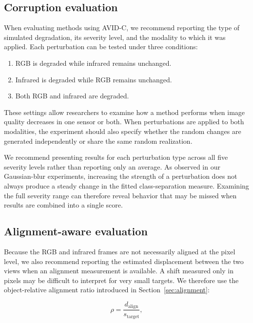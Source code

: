 \documentclass[10pt]{article}
\newcommand{\corrupt}{\textsc{AVID-C}}
\begin{document}
\subsection{Corruption evaluation}

When evaluating methods using \corrupt{}, we recommend reporting the type of simulated degradation, its severity level, and the modality to which it was applied. Each perturbation can be tested under three conditions:

\begin{enumerate}
    \item RGB is degraded while infrared remains unchanged.
    \item Infrared is degraded while RGB remains unchanged.
    \item Both RGB and infrared are degraded.
\end{enumerate}

These settings allow researchers to examine how a method performs when image quality decreases in one sensor or both. When perturbations are applied to both modalities, the experiment should also specify whether the random changes are generated independently or share the same random realization.

We recommend presenting results for each perturbation type across all five severity levels rather than reporting only an average. As observed in our Gaussian-blur experiments, increasing the strength of a perturbation does not always produce a steady change in the fitted class-separation measure. Examining the full severity range can therefore reveal behavior that may be missed when results are combined into a single score.

\subsection{Alignment-aware evaluation}

Because the RGB and infrared frames are not necessarily aligned at the pixel level, we also recommend reporting the estimated displacement between the two views when an alignment measurement is available. A shift measured only in pixels may be difficult to interpret for very small targets. We therefore use the object-relative alignment ratio introduced in Section~\ref{sec:alignment}:

\begin{equation}
\rho=\frac{d_{\mathrm{align}}}{s_{\mathrm{target}}},
\end{equation}
\end{document}
